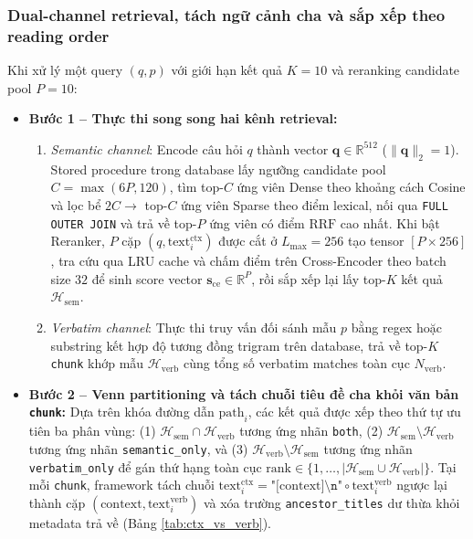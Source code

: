 \subsubsection{Dual-channel retrieval, tách ngữ cảnh cha và sắp xếp theo reading order}
Khi xử lý một query $(q, p)$ với giới hạn kết quả $K = 10$ và reranking candidate pool $P = 10$:
\begin{itemize}
    \item \textbf{Bước 1 -- Thực thi song song hai kênh retrieval:}
    \begin{enumerate}
        \item \textit{Semantic channel}: Encode câu hỏi $q$ thành vector $\mathbf{q} \in \mathbb{R}^{512}$ ($\|\mathbf{q}\|_2 = 1$). Stored procedure trong database lấy ngưỡng candidate pool $C = \max(6P, 120)$, tìm top-$C$ ứng viên Dense theo khoảng cách Cosine và lọc bể $2C \rightarrow$ top-$C$ ứng viên Sparse theo điểm lexical, nối qua \texttt{FULL OUTER JOIN} và trả về top-$P$ ứng viên có điểm $\text{RRF}$ cao nhất. Khi bật Reranker, $P$ cặp $(q, \text{text}^{\text{ctx}}_i)$ được cắt ở $L_{\max} = 256$ tạo tensor $[P \times 256]$, tra cứu qua LRU cache và chấm điểm trên Cross-Encoder theo batch size $32$ để sinh score vector $\mathbf{s}_{\text{ce}} \in \mathbb{R}^{P}$, rồi sắp xếp lại lấy top-$K$ kết quả $\mathcal{H}_{\text{sem}}$.
        \item \textit{Verbatim channel}: Thực thi truy vấn đối sánh mẫu $p$ bằng regex hoặc substring kết hợp độ tương đồng trigram trên database, trả về top-$K$ \texttt{chunk} khớp mẫu $\mathcal{H}_{\text{verb}}$ cùng tổng số verbatim matches toàn cục $N_{\text{verb}}$.
    \end{enumerate}
    \item \textbf{Bước 2 -- Venn partitioning và tách chuỗi tiêu đề cha khỏi văn bản \texttt{chunk}:} Dựa trên khóa đường dẫn $\text{path}_i$, các kết quả được xếp theo thứ tự ưu tiên ba phân vùng: (1) $\mathcal{H}_{\text{sem}} \cap \mathcal{H}_{\text{verb}}$ tương ứng nhãn \texttt{both}, (2) $\mathcal{H}_{\text{sem}} \setminus \mathcal{H}_{\text{verb}}$ tương ứng nhãn \texttt{semantic\_only}, và (3) $\mathcal{H}_{\text{verb}} \setminus \mathcal{H}_{\text{sem}}$ tương ứng nhãn \texttt{verbatim\_only} để gán thứ hạng toàn cục $\text{rank} \in \{1, \dots, |\mathcal{H}_{\text{sem}} \cup \mathcal{H}_{\text{verb}}|\}$. Tại mỗi \texttt{chunk}, framework tách chuỗi $\text{text}^{\text{ctx}}_i = \texttt{"[}\text{context}\texttt{]\textbackslash n"} \circ \text{text}^{\text{verb}}_i$ ngược lại thành cặp $(\text{context}, \text{text}^{\text{verb}}_i)$ và xóa trường \texttt{ancestor\_titles} dư thừa khỏi metadata trả về (Bảng \ref{tab:ctx_vs_verb}).

\end{itemize}
